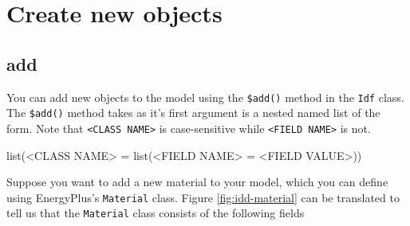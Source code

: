 \documentclass[
]{book}
\newenvironment{Shaded}{\begin{snugshade}}{\end{snugshade}}
\newcommand{\AttributeTok}[1]{\textcolor[rgb]{0.77,0.63,0.00}{#1}}
\newcommand{\DocumentationTok}[1]{\textcolor[rgb]{0.56,0.35,0.01}{\textbf{\textit{#1}}}}
\newcommand{\NormalTok}[1]{#1}
\newcommand{\SpecialCharTok}[1]{\textcolor[rgb]{0.00,0.00,0.00}{#1}}
\newcommand{\StringTok}[1]{\textcolor[rgb]{0.31,0.60,0.02}{#1}}
\begin{document}
\begin{Shaded}
\end{Shaded}

\hypertarget{create-new-objects}{%
\section{Create new objects}\label{create-new-objects}}

\hypertarget{add}{%
\subsection{add}\label{add}}

You can add new objects to the model using the \texttt{\$add()} method in the \texttt{Idf} class. The \texttt{\$add()} method takes as it's first argument is a nested named list of the form. Note that \texttt{\textless{}CLASS\ NAME\textgreater{}} is case-sensitive while \texttt{\textless{}FIELD\ NAME\textgreater{}} is not.

\begin{Shaded}
\begin{Highlighting}[]
\StringTok{\textasciigrave{}}\AttributeTok{list(\textless{}CLASS NAME\textgreater{} = list(\textless{}FIELD NAME\textgreater{} = \textless{}FIELD VALUE\textgreater{}))}\StringTok{\textasciigrave{}}
\end{Highlighting}
\end{Shaded}

Suppose you want to add a new material to your model, which you can define using EnergyPlus's \texttt{Material} class. Figure \ref{fig:idd-material} can be translated to tell us that the \texttt{Material} class consists of the following fields
\end{document}
